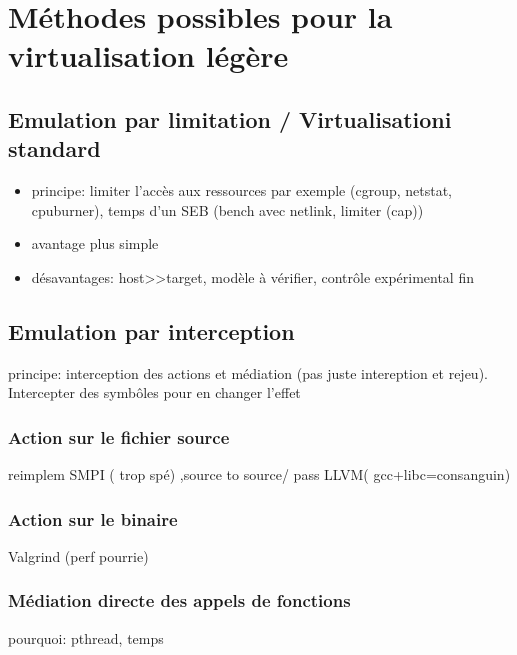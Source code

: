 \section{Méthodes possibles pour la virtualisation légère}
\label{section:emulation}
\subsection{Emulation par limitation / Virtualisationi standard}
\begin{itemize}
\item principe: limiter l'accès aux ressources par exemple (cgroup, netstat, cpuburner), temps d'un SEB (bench avec netlink, limiter (cap))
\item avantage plus simple
\item désavantages: host>>target, modèle à vérifier, contrôle expérimental fin
\end{itemize}

\subsection{Emulation par interception}
 principe: interception des actions et médiation (pas juste intereption et rejeu). Intercepter des symbôles pour en changer l'effet

\subsubsection{Action sur le fichier source}
reimplem SMPI ( trop spé) ,source to source/ pass LLVM( gcc+libc=consanguin) 

\subsubsection{Action sur le binaire}
Valgrind (perf pourrie)

\subsubsection{Médiation directe des appels de fonctions}
pourquoi: pthread, temps

